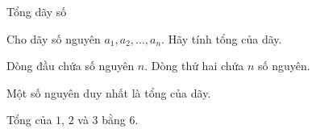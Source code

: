 \documentclass[11pt, a4paper, oneside]{article}
\begin{document}
\begin{problem}[input = stdin, output = stdout, time = 1, memory = 256]{Tổng dãy số}

Cho dãy số nguyên $a_1, a_2, \dots, a_n$. Hãy tính tổng của dãy.

\InputFile
Dòng đầu chứa số nguyên $n$. Dòng thứ hai chứa $n$ số nguyên.

\OutputFile
Một số nguyên duy nhất là tổng của dãy.

\begin{subtasks}
\end{subtasks}

\Examples
\begin{example}
%
\end{example}

\Explanation
Tổng của $1$, $2$ và $3$ bằng $6$.

\end{problem}
\end{document}
